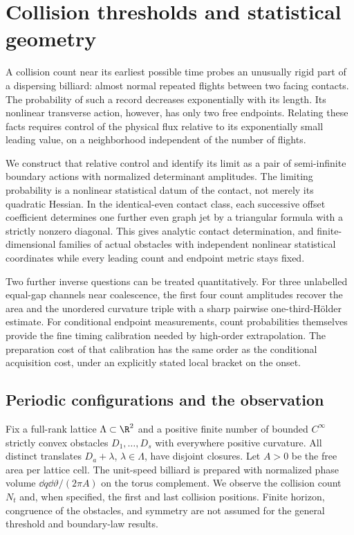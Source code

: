 \section{Collision thresholds and statistical geometry}
\label{sec:geometric-results}
A collision count near its earliest possible time probes an unusually
rigid part of a dispersing billiard: almost normal repeated flights
between two facing contacts. The probability of such a record decreases
exponentially with its length. Its nonlinear transverse action, however,
has only two free endpoints. Relating these facts requires control of the
physical flux relative to its exponentially small leading value, on a
neighborhood independent of the number of flights.

We construct that relative control and identify its limit as a pair of
semi-infinite boundary actions with normalized determinant amplitudes.
The limiting probability is a nonlinear statistical datum of the contact,
not merely its quadratic Hessian. In the identical-even contact class,
each successive offset coefficient determines one further even graph
jet by a triangular formula with a strictly nonzero diagonal. This gives
analytic contact determination, and finite-dimensional families of actual
obstacles with independent nonlinear statistical coordinates while every
leading count and endpoint metric stays fixed.

Two further inverse questions can be treated quantitatively. For three
unlabelled equal-gap channels near coalescence, the first four count
amplitudes recover the area and the unordered curvature triple with a
sharp pairwise one-third-H\"older estimate. For conditional endpoint
measurements, count probabilities themselves provide the fine timing
calibration needed by high-order extrapolation. The preparation cost of
that calibration has the same order as the conditional acquisition cost,
under an explicitly stated local bracket on the onset.

\subsection{Periodic configurations and the observation}
Fix a full-rank lattice $\Lambda\subset\R^2$ and a positive finite number
of bounded $C^\infty$ strictly convex obstacles $D_1,\ldots,D_s$ with
everywhere positive curvature. All distinct translates $D_a+\lambda$,
$\lambda\in\Lambda$, have disjoint closures. Let $A>0$ be the free area
per lattice cell. The unit-speed billiard is prepared with normalized
phase volume $\dd q\dd\vartheta/(2\pi A)$ on the torus complement.
We observe the collision count $N_t$ and, when specified, the first and
last collision positions. Finite horizon, congruence of the obstacles,
and symmetry are not assumed for the general threshold and boundary-law
results.


